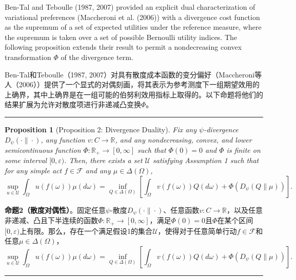 \documentclass[12pt,a4paper]{article}
\newenvironment{original}
  {\par\noindent\color{black}\smallskip}
  {\par\smallskip}
\newenvironment{translation}
  {\par\noindent\color{blue!70!black}\smallskip}
  {\par\medskip\hrule\medskip}
\newtheorem{proposition}[theorem]{Proposition}
\begin{document}
\begin{original}
Ben-Tal and Teboulle (1987, 2007) provided an explicit dual characterization of variational preferences (Maccheroni et al. (2006)) with a divergence cost function as the supremum of a set of expected utilities under the reference measure, where the supremum is taken over a set of possible Bernoulli utility indices. The following proposition extends their result to permit a nondecreasing convex transformation $\Phi$ of the divergence term.
\end{original}
\begin{translation}
Ben-Tal和Teboulle（1987, 2007）对具有散度成本函数的变分偏好（Maccheroni等人（2006））提供了一个显式的对偶刻画，将其表示为参考测度下一组期望效用的上确界，其中上确界是在一组可能的伯努利效用指标上取得的。以下命题将他们的结果扩展为允许对散度项进行非递减凸变换$\Phi$。
\end{translation}

\begin{proposition}[Proposition 2: Divergence Duality]
Fix any $\psi$-divergence $D_\psi(\cdot\|\cdot)$, any function $v: C \to \mathbb{R}$, and any nondecreasing, convex, and lower semicontinuous function $\Phi: \mathbb{R}_+ \to [0, \infty]$ such that $\Phi(0) = 0$ and $\Phi$ is finite on some interval $[0, \varepsilon)$. Then, there exists a set $\mathcal{U}$ satisfying Assumption 1 such that for any simple act $f \in \mathcal{F}$ and any $\mu \in \Delta(\Omega)$,
\[
\sup_{u \in \mathcal{U}} \int_\Omega u(f(\omega)) \mu(d\omega) = \inf_{Q \in \Delta(\Omega)} \left[ \int_\Omega v(f(\omega)) Q(d\omega) + \Phi(D_\psi(Q\|\mu)) \right].
\]
\end{proposition}
\begin{translation}
\textbf{命题2（散度对偶性）}。固定任意$\psi$-散度$D_\psi(\cdot\|\cdot)$、任意函数$v: C \to \mathbb{R}$，以及任意非递减、凸且下半连续的函数$\Phi: \mathbb{R}_+ \to [0, \infty]$，满足$\Phi(0) = 0$且$\Phi$在某个区间$[0, \varepsilon)$上有限。那么，存在一个满足假设1的集合$\mathcal{U}$，使得对于任意简单行动$f \in \mathcal{F}$和任意$\mu \in \Delta(\Omega)$，
\[
\sup_{u \in \mathcal{U}} \int_\Omega u(f(\omega)) \mu(d\omega) = \inf_{Q \in \Delta(\Omega)} \left[ \int_\Omega v(f(\omega)) Q(d\omega) + \Phi(D_\psi(Q\|\mu)) \right].
\]
\end{translation}
\end{document}
